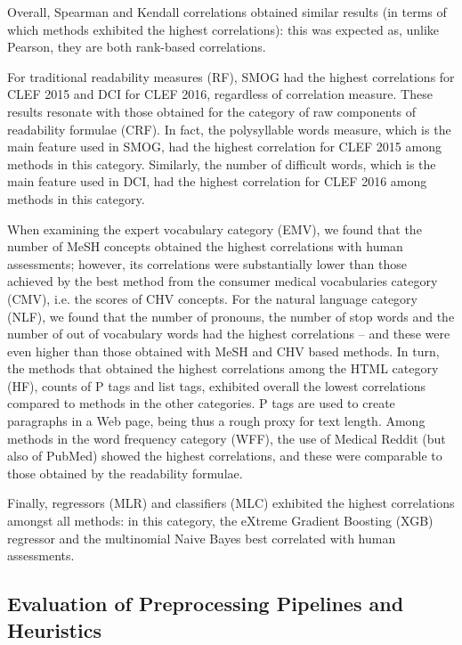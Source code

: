 \documentclass[10pt,a4paper]{article}
\begin{document}
Overall, Spearman and Kendall correlations obtained similar results (in terms of which methods exhibited the highest correlations): this was expected as, unlike Pearson, they are both rank-based correlations.

For traditional readability measures (RF), SMOG had the highest correlations for CLEF 2015 and DCI for CLEF 2016, regardless of correlation measure. These results resonate with those obtained for the category of raw components of readability formulae (CRF). 
In fact, the polysyllable words measure, which is the main feature used in SMOG, had the highest correlation for CLEF 2015 among methods in this category. Similarly, the number of difficult words, which is the main feature used in DCI, had the highest correlation for CLEF 2016 among methods in this category.

When examining the expert vocabulary category (EMV), we found that the number of MeSH concepts obtained the highest correlations with human assessments; however, its correlations were substantially lower than those achieved by the best method from the consumer medical vocabularies category (CMV), i.e. the scores of CHV concepts. For the natural language category (NLF), we found that the number of pronouns, the number of stop words and the number of out of vocabulary words had the highest correlations -- and these were even higher than those obtained with MeSH and CHV based methods. In turn, the methods that obtained the highest correlations among the HTML category (HF), counts of P tags and list tags, exhibited overall the lowest correlations compared to methods in the other categories. P tags are used to create paragraphs in a Web page, being thus a rough proxy for text length. 
Among methods in the word frequency category (WFF), the use of Medical Reddit (but also of PubMed) showed the highest correlations, and these were comparable to those obtained by the readability formulae. 

Finally, regressors (MLR) and classifiers (MLC) exhibited the highest correlations amongst all methods: in this category, the  eXtreme Gradient Boosting (XGB) regressor and the multinomial Naive Bayes best correlated with human assessments. 

\subsection*{Evaluation of Preprocessing Pipelines and Heuristics}
\label{sec:which_preprocessing}
\end{document}
